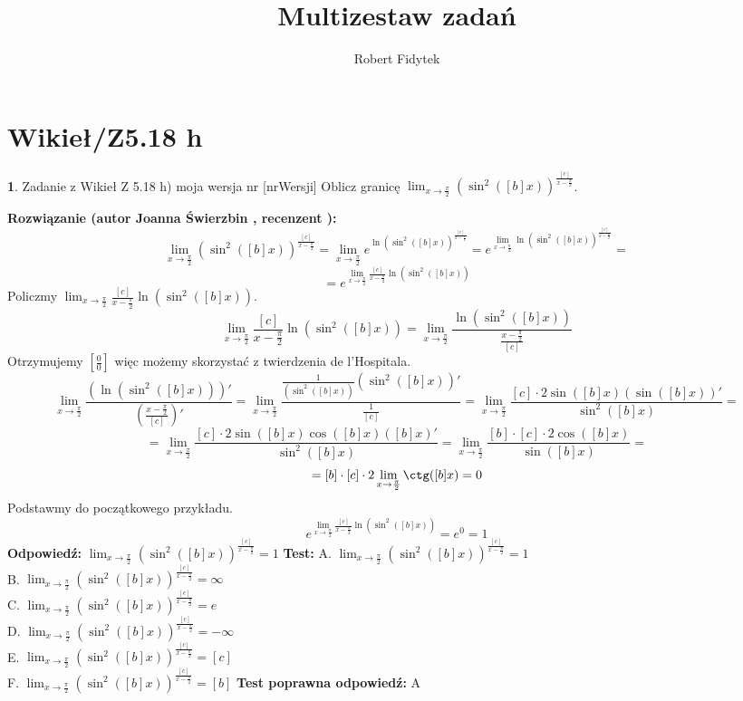 \documentclass[12pt, a4paper]{article}
\title{Multizestaw zadań}
\author{Robert Fidytek}
\date{}
\theoremstyle{definition} %
\newtheorem{zad}{}
\newcommand{\kategoria}[1]{\section{#1}} %
\newcommand{\zadStart}[1]{\begin{zad}#1\newline} %
\newcommand{\zadStop}{\end{zad}}   %
\newcommand{\rozwStart}[2]{\noindent \textbf{Rozwiązanie (autor #1 , recenzent #2): }\newline} %
\newcommand{\rozwStop}{\newline}                                            %
\newcommand{\odpStart}{\noindent \textbf{Odpowiedź:}\newline}    %
\newcommand{\odpStop}{\newline}                                             %
\newcommand{\testStart}{\noindent \textbf{Test:}\newline} %
\newcommand{\testStop}{\newline} %
\newcommand{\kluczStart}{\noindent \textbf{Test poprawna odpowiedź:}\newline} %
\newcommand{\kluczStop}{\newline} %
\begin{document}
\maketitle


\kategoria{Wikieł/Z5.18 h}
\zadStart{Zadanie z Wikieł Z 5.18 h) moja wersja nr [nrWersji]}
Oblicz granicę $\lim_{x \rightarrow \frac{\pi}{2}} \left(\sin^2([b]x) \right)^{\frac{[c]}{x-\frac{\pi}{2}}}$.
\zadStop
\rozwStart{Joanna Świerzbin}{}
$$ \lim_{x \rightarrow \frac{\pi}{2}} \left(\sin^2([b]x) \right)^{\frac{[c]}{x-\frac{\pi}{2}}}= \lim_{x \rightarrow \frac{\pi}{2}} e^{\ln{\left(\sin^2([b]x) \right)^{\frac{[c]}{x-\frac{\pi}{2}}}}}=e^{\lim_{x \rightarrow \frac{\pi}{2}}{\ln{\left(\sin^2([b]x) \right)^{\frac{[c]}{x-\frac{\pi}{2}}}}}}=$$
$$=e^{\lim_{x \rightarrow \frac{\pi}{2}}{\frac{[c]}{x-\frac{\pi}{2}}}{\ln{\left(\sin^2([b]x) \right)}}}$$
Policzmy $ \lim_{x \rightarrow \frac{\pi}{2}}{\frac{[c]}{x-\frac{\pi}{2}}}{\ln{\left(\sin^2([b]x) \right)}}$.
$$\lim_{x \rightarrow \frac{\pi}{2}}{\frac{[c]}{x-\frac{\pi}{2}}}{\ln{\left(\sin^2([b]x) \right)}}=\lim_{x \rightarrow \frac{\pi}{2}}\frac{\ln{\left(\sin^2([b]x) \right)}}{{\frac{x-\frac{\pi}{2}}{[c]}}}$$
Otrzymujemy $ \left[ \frac{0}{0} \right] $ więc możemy skorzystać z twierdzenia de l'Hospitala.
$$\lim_{x \rightarrow \frac{\pi}{2}}\frac{\left(\ln{\left(\sin^2([b]x) \right)}\right)'}{\left({\frac{x-\frac{\pi}{2}}{[c]}}\right)'} = \lim_{x \rightarrow \frac{\pi}{2}}\frac{\frac{1}{\left(\sin^2([b]x) \right)}\left( \sin^2([b]x) \right)'}{{\frac{1}{[c]}}} = \lim_{x \rightarrow \frac{\pi}{2}}\frac{[c] \cdot 2 \sin([b]x)(\sin([b]x))'}{\sin^2([b]x)}=$$
$$= \lim_{x \rightarrow \frac{\pi}{2}}\frac{[c] \cdot 2 \sin([b]x) \cos([b]x) ([b]x)'}{\sin^2([b]x)}= \lim_{x \rightarrow \frac{\pi}{2}}\frac{[b]\cdot[c] \cdot 2 \cos([b]x)}{\sin([b]x)}=$$ $$ =[b]\cdot[c] \cdot 2 \lim_{x \rightarrow \frac{\pi}{2}}\ctg([b]x) = 0$$
Podstawmy do początkowego przykładu.
$$e^{\lim_{x \rightarrow \frac{\pi}{2}}{\frac{[c]}{x-\frac{\pi}{2}}}{\ln{\left(\sin^2([b]x) \right)}}} = e^{0} =1 $$
\rozwStop
\odpStart
$\lim_{x \rightarrow \frac{\pi}{2}} \left(\sin^2([b]x) \right)^{\frac{[c]}{x-\frac{\pi}{2}}} = 1$
\odpStop
\testStart
A. $\lim_{x \rightarrow \frac{\pi}{2}} \left(\sin^2([b]x) \right)^{\frac{[c]}{x-\frac{\pi}{2}}} = 1$\\
B. $\lim_{x \rightarrow \frac{\pi}{2}} \left(\sin^2([b]x) \right)^{\frac{[c]}{x-\frac{\pi}{2}}} = \infty$\\
C. $\lim_{x \rightarrow \frac{\pi}{2}} \left(\sin^2([b]x) \right)^{\frac{[c]}{x-\frac{\pi}{2}}} = e$\\
D. $\lim_{x \rightarrow \frac{\pi}{2}} \left(\sin^2([b]x) \right)^{\frac{[c]}{x-\frac{\pi}{2}}} = -\infty$\\
E. $\lim_{x \rightarrow \frac{\pi}{2}} \left(\sin^2([b]x) \right)^{\frac{[c]}{x-\frac{\pi}{2}}} = [c]$\\
F. $\lim_{x \rightarrow \frac{\pi}{2}} \left(\sin^2([b]x) \right)^{\frac{[c]}{x-\frac{\pi}{2}}} = [b]$
\testStop
\kluczStart
A
\kluczStop
\end{document}
